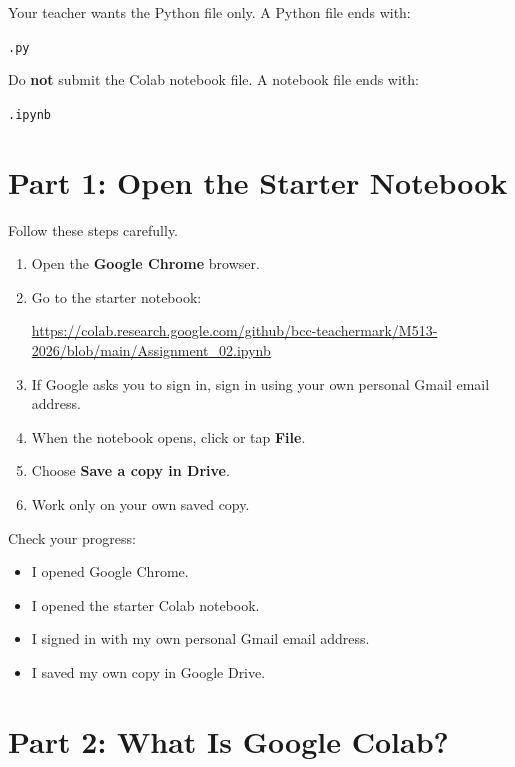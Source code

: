 \documentclass[11pt]{article}
\newcommand{\checkbox}{$\square$}
\begin{document}
\noindent
Your teacher wants the Python file only. A Python file ends with:

\begin{center}
\texttt{.py}
\end{center}

\noindent
Do \textbf{not} submit the Colab notebook file. A notebook file ends with:

\begin{center}
\texttt{.ipynb}
\end{center}

\section*{Part 1: Open the Starter Notebook}

Follow these steps carefully.

\begin{enumerate}
    \item Open the \textbf{Google Chrome} browser.
    \item Go to the starter notebook:

    \begin{center}
    \url{https://colab.research.google.com/github/bcc-teachermark/M513-2026/blob/main/Assignment_02.ipynb}
    \end{center}

    \item If Google asks you to sign in, sign in using your own personal Gmail email address.
    \item When the notebook opens, click or tap \textbf{File}.
    \item Choose \textbf{Save a copy in Drive}.
    \item Work only on your own saved copy.
\end{enumerate}

\noindent Check your progress:

\begin{itemize}
    \item[\checkbox] I opened Google Chrome.
    \item[\checkbox] I opened the starter Colab notebook.
    \item[\checkbox] I signed in with my own personal Gmail email address.
    \item[\checkbox] I saved my own copy in Google Drive.
\end{itemize}

\section*{Part 2: What Is Google Colab?}
\end{document}
